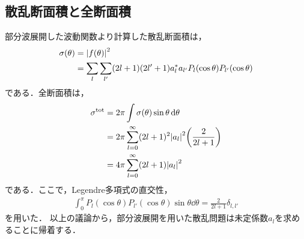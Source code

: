 \documentclass{report}
\begin{document}
  \subsection{散乱断面積と全断面積}
    部分波展開した波動関数より計算した散乱断面積は，
    \begin{align}
      \sigma(\theta) &= \abs{f(\theta)}^2 \\
      &= \sum_{l} \sum_{l'} (2l+1)(2l'+1) a_l^{*}a_{l'} P_l(\cos\theta) P_{l'}(\cos\theta)
    \end{align}
    である．全断面積は，
    \begin{align}
      \sigma^{\mathrm{tot}} &= 2\pi \int \sigma(\theta) \sin\theta \dd{\theta} \\
      &= 2\pi \sum_{l = 0}^{\infty} (2l + 1)^2\abs{a_l}^2\qty(\frac{2}{2l + 1}) \\
      &= 4\pi \sum_{l = 0}^{\infty} (2l + 1) \abs{a_l}^2
    \end{align}
    である．ここで，Legendre多項式の直交性，
    \begin{align}
      \int_{0}^{\pi} P_l(\cos\theta)P_{l'}(\cos\theta) \sin\theta \dd{\theta} = \frac{2}{2l+1}\delta_{l, l'}
    \end{align}
    を用いた．
    以上の議論から，部分波展開を用いた散乱問題は未定係数$a_l$を求めることに帰着する．
\end{document}
